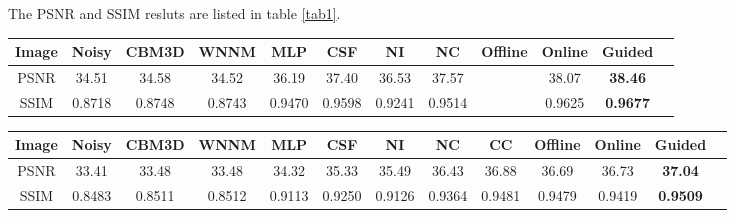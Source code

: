 \documentclass[10pt,twocolumn,letterpaper]{article}
\begin{document}
The PSNR and SSIM resluts are listed in table \ref{tab1}.
\begin{table*}\label{tab1}
\caption{Average PSNR(dB) results of different methods on 60 cropped real noisy images captured in \cite{crosschannel2016}.}
\label{tab1}
\begin{center}
\renewcommand\arraystretch{1}
\begin{tabular}{|c||c|c|c|c|c|c|c|c|c|c|c|}
\hline
Image & \textbf{Noisy} &\textbf{CBM3D}&\textbf{WNNM}&\textbf{MLP}&\textbf{CSF}& \textbf{NI}& \textbf{NC}&\textbf{Offline} &\textbf{Online} &\textbf{Guided} 
\\
\hline
PSNR & 34.51  &  34.58 &  34.52  & 36.19   & 37.40 &  36.53  &  37.57  &     & 38.07 &  \textbf{ 38.46}
\\
\hline
SSIM & 0.8718  & 0.8748  & 0.8743   & 0.9470 & 0.9598  & 0.9241  &  0.9514  &     & 0.9625 &   \textbf{0.9677}
\\
\hline
\end{tabular}
\end{center}
\end{table*}

\begin{table*}\label{tab2}
\caption{Average PSNR(dB) results of different methods on 15 cropped real noisy images used in \cite{crosschannel2016}.}
\label{tab1}
\begin{center}
\renewcommand\arraystretch{1}
\begin{tabular}{|c||c|c|c|c|c|c|c|c|c|c|c|c|}
\hline
Image & \textbf{Noisy} &\textbf{CBM3D}&\textbf{WNNM}&\textbf{MLP}&\textbf{CSF}& \textbf{NI}& \textbf{NC}& \textbf{CC}&\textbf{Offline} &\textbf{Online} &\textbf{Guided} 
\\
\hline
PSNR & 33.41  &  33.48 &  33.48  & 34.32   & 35.33 &  35.49   &  36.43  &  36.88  & 36.69 & 36.73 &  \textbf{ 37.04}
\\
\hline
SSIM & 0.8483  & 0.8511  & 0.8512   & 0.9113 & 0.9250  & 0.9126  &  0.9364  & 0.9481  & 0.9479 & 0.9419 &  \textbf{ 0.9509}
\\
\hline
\end{tabular}
\end{center}
\end{table*}
\end{document}
